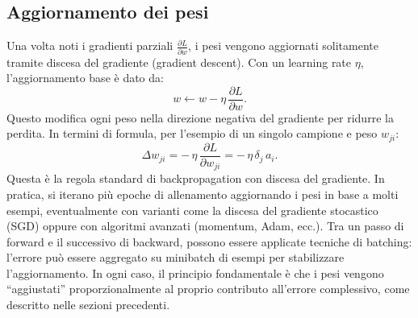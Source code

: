 \documentclass[a4paper,12pt]{report}
\begin{document}
	\subsection{Aggiornamento dei pesi}
	Una volta noti i gradienti parziali $\frac{\partial L}{\partial w}$, i pesi vengono aggiornati solitamente tramite discesa del gradiente (gradient descent). Con un learning rate $\eta$, l'aggiornamento base è dato da:
	\[
	w \leftarrow w - \eta\,\frac{\partial L}{\partial w}.
	\]
	Questo modifica ogni peso nella direzione negativa del gradiente per ridurre la perdita. In termini di formula, per l'esempio di un singolo campione e peso $w_{ji}$:
	\[
	\Delta w_{ji} = -\,\eta\,\frac{\partial L}{\partial w_{ji}} = -\,\eta\,\delta_j\,a_i.
	\]
	Questa è la regola standard di backpropagation con discesa del gradiente. In pratica, si iterano più epoche di allenamento aggiornando i pesi in base a molti esempi, eventualmente con varianti come la discesa del gradiente stocastico (SGD) oppure con algoritmi avanzati (momentum, Adam, ecc.). Tra un passo di forward e il successivo di backward, possono essere applicate tecniche di batching: l'errore può essere aggregato su minibatch di esempi per stabilizzare l'aggiornamento. In ogni caso, il principio fondamentale è che i pesi vengono ``aggiustati'' proporzionalmente al proprio contributo all'errore complessivo, come descritto nelle sezioni precedenti.
	
\end{document}
